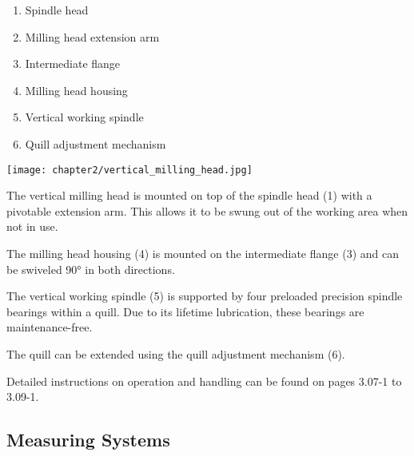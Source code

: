 \begin{minipage}{0.5\textwidth}
    \begin{enumerate}[itemsep=1pt,parsep=0pt]
        \item Spindle head
        \item Milling head extension arm
        \item Intermediate flange
        \item Milling head housing
        \item Vertical working spindle
        \item Quill adjustment mechanism
    \end{enumerate}
\end{minipage}%
\begin{minipage}{0.5\textwidth}
    \centering
    \texttt{[image: chapter2/vertical\_milling\_head.jpg]}
    \label{fig:vertical_milling_head}
\end{minipage}

\vspace{1cm}

\noindent The vertical milling head is mounted on top of the spindle head (1) with a pivotable extension arm. This allows it to be swung out of the working area when not in use.

\vspace{.3cm}

\noindent The milling head housing (4) is mounted on the intermediate flange (3) and can be swiveled 90° in both directions.

\vspace{.3cm}

\noindent The vertical working spindle (5) is supported by four preloaded precision spindle bearings within a quill. Due to its lifetime lubrication, these bearings are maintenance-free.

\vspace{.3cm}

\noindent The quill can be extended using the quill adjustment mechanism (6).

\vspace{.3cm}

\noindent Detailed instructions on operation and handling can be found on pages 3.07-1 to 3.09-1.

\newpage
\subsection{Measuring Systems}

